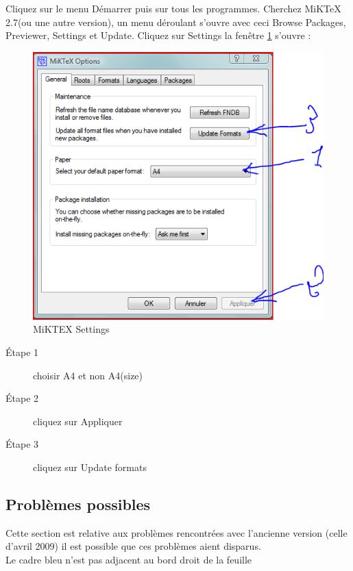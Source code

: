 \documentclass[10pt]{article}
\begin{document}
Cliquez sur le menu D\'emarrer puis sur \og tous les programmes\fg{}. Cherchez MiK\TeX{} 2.7(ou une autre version), un menu d\'eroulant s'ouvre avec ceci Browse Packages, 
Previewer, Settings et Update. Cliquez sur \og Settings \fg{} la fen\^etre \ref{image} s'ouvre :


\begin{figure}%
\hspace*{-2cm}  \includegraphics{miktex_option.png}
\caption{MiKTEX Settings}\label{image}
\end{figure}
\begin{description}
 \item[\'Etape 1] choisir A4 et non A4(size)
 \item[\'Etape 2] cliquez sur Appliquer
 \item[\'Etape 3] cliquez sur Update formats
 \end{description}



\subsection{Probl\`emes possibles}

Cette section est  relative aux probl\`emes rencontr\'ees avec l'ancienne version (celle d'avril 2009) il est possible
 que ces probl\`emes aient disparus.\\
	Le cadre bleu n'est pas adjacent au bord droit de la feuille
\end{document}
